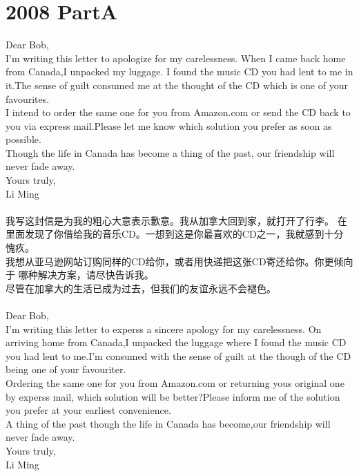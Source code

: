 \documentclass[UTF8]{article}
\begin{document}
    \section*{2008 PartA}
    Dear Bob,
    \\
    I'm writing this letter to apologize for my carelessness.
    When I came back home from Canada,I unpacked my luggage.
    I found the music CD you had lent to me in it.The sense of
    guilt consumed me at the thought of the CD which is one of
    your favourites.\\
    I intend to order the same one for you from Amazon.com or
    send the CD back to you via express mail.Please let me know
    which solution you prefer as soon as possible.\\
    Though the life in Canada has become a thing of the past,
    our friendship will never fade away.\\
    Yours truly,\\
    Li Ming
    \\\\
    我写这封信是为我的粗心大意表示歉意。我从加拿大回到家，就打开了行李。
    在里面发现了你借给我的音乐CD。一想到这是你最喜欢的CD之一，我就感到十分
    愧疚。\\
    我想从亚马逊网站订购同样的CD给你，或者用快递把这张CD寄还给你。你更倾向于
    哪种解决方案，请尽快告诉我。\\
    尽管在加拿大的生活已成为过去，但我们的友谊永远不会褪色。
    \\\\
    Dear Bob,\\
    I'm writing this letter to experss a sincere apology for my carelessness.
    On arriving home from Canada,I unpacked the luggage where I found the music CD 
    you had lent to me.I'm consumed with the sense of guilt at the though of the CD 
    being one of your favouriter.\\
    Ordering the same one for you from Amazon.com or returning yous original one by experss mail,
    which solution will be better?Please inform me of the solution you prefer at your earliest convenience.\\
    A thing of the past though the life in Canada has become,our friendship will never fade away.\\
    Yours truly,\\
    Li Ming
\end{document}
